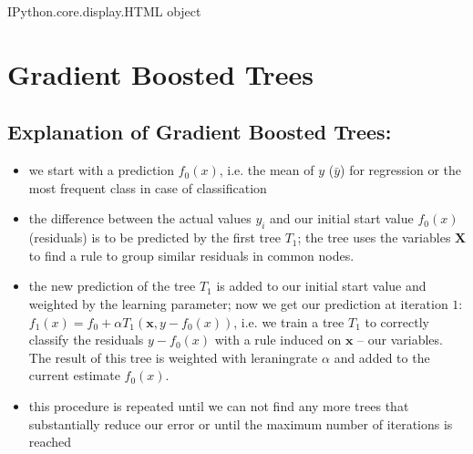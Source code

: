 \documentclass[letterpaper,10pt,english]{jupyterBook}
\begin{document}
\noindent{}

\noindent{}

\begin{sphinxVerbatim}[commandchars=\\\{\}]
\PYGZlt{}IPython.core.display.HTML object\PYGZgt{}
\end{sphinxVerbatim}


\chapter{Gradient Boosted Trees}
\label{\detokenize{Tree_Methods:gradient-boosted-trees}}
\noindent{}


\section{Explanation of Gradient Boosted Trees:}
\label{\detokenize{Tree_Methods:explanation-of-gradient-boosted-trees}}\begin{itemize}
\item {} 
\sphinxAtStartPar
we start with a prediction \(f_0(x)\), i.e. the mean of \(y\) (\(\bar{y}\)) for regression or the most frequent class in case of classification

\item {} 
\sphinxAtStartPar
the difference between the actual values \(y_i\) and our initial start value \(f_0(x)\) (residuals) is to be predicted by the first tree \(T_1\); the tree uses the variables \(\pmb{X}\) to find a rule to group similar residuals in common nodes.

\item {} 
\sphinxAtStartPar
the new prediction of the tree \(T_1\) is added to our initial start value and weighted by the learning parameter; now we get our prediction at iteration \(1\): \(f_1(x) = f_0 + \alpha T_1(\pmb{x}, y - f_0(x))\), i.e. we train a tree \(T_1\) to correctly classify the residuals \(y - f_0(x)\) with a rule induced on \(\pmb{x}\) – our variables. The result of this tree is weighted with leraning\sphinxhyphen{}rate \(\alpha\) and added to the current estimate \(f_0(x)\).

\item {} 
\sphinxAtStartPar
this procedure is repeated until we can not find any more trees that substantially reduce our error or until the maximum number of iterations is reached

\end{itemize}
\end{document}
